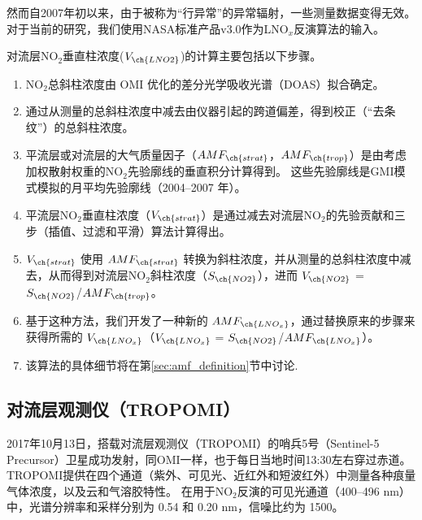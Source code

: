 然而自2007年初以来，由于被称为“行异常”的异常辐射\citep{Dobber.2008}，一些测量数据变得无效。
对于当前的研究，我们使用NASA标准产品v3.0\citep{Krotkov.2017}作为LNO$_x$反演算法的输入。

对流层NO$_2$垂直柱浓度($V_{\ch{LNO2}}$)的计算主要包括以下步骤。

\begin{enumerate}[label=(\arabic*), labelindent=\parindent, leftmargin=0pt, widest=0, itemindent=*, topsep=0pt, partopsep=0pt, parsep=0pt]

\item NO$_2$总斜柱浓度由 OMI 优化的差分光学吸收光谱（DOAS）拟合确定。

\item 通过从测量的总斜柱浓度中减去由仪器引起的跨道偏差，得到校正（“去条纹”）的总斜柱浓度。

\item 平流层或对流层的大气质量因子（$AMF_{\ch{strat}}$，$AMF_{\ch{trop}}$）是由考虑加权散射权重的NO$_2$先验廓线的垂直积分计算得到。
这些先验廓线是GMI模式模拟的月平均先验廓线（2004--2007 年）。

\item 平流层NO$_2$垂直柱浓度（$V_{\ch{strat}}$）是通过减去对流层NO$_2$的先验贡献和三步（插值、过滤和平滑）算法计算得出\citep{Bucsela.2013}。

\item $V_{\ch{strat}}$ 使用 $AMF_{\ch{strat}}$ 转换为斜柱浓度，并从测量的总斜柱浓度中减去，从而得到对流层NO$_2$斜柱浓度（$S_{\ch{NO2}}$），进而 $V_{\ch{NO2}}$ = $S_{\ch{NO2}}$/$AMF_{\ch{trop}}$。

\item 基于这种方法，我们开发了一种新的 $AMF_{\ch{LNO_x}}$，通过替换原来的步骤来获得所需的 $V_{\ch{LNO_x}}$（$V_{\ch{LNO_x}}$ = $S_{\ch{NO2}}$/$AMF_{\ch{LNO_x}}$）。

\item 该算法的具体细节将在第\ref{sec:amf_definition}节中讨论.

\end{enumerate}

\subsection{对流层观测仪（TROPOMI）}

2017年10月13日，搭载对流层观测仪（TROPOMI）的哨兵5号（Sentinel-5 Precursor）卫星成功发射\citep{Veefkind.2012}，同OMI一样，也于每日当地时间13:30左右穿过赤道。
TROPOMI提供在四个通道（紫外、可见光、近红外和短波红外）中测量各种痕量气体浓度，以及云和气溶胶特性。
在用于NO$_2$反演的可见光通道（400–496 nm）中，光谱分辨率和采样分别为 0.54 和 0.20 nm，信噪比约为 1500。

